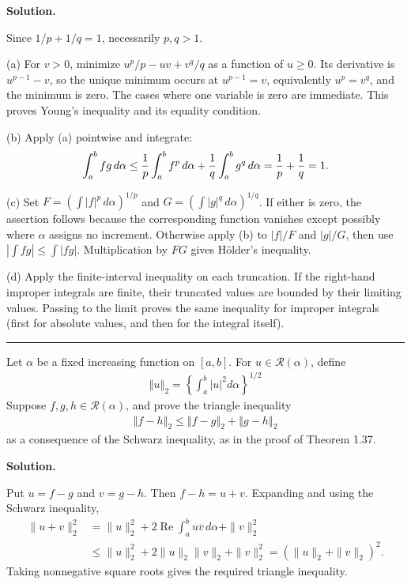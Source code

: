 \documentclass[12pt]{article}
\theoremstyle{definition}
\begin{document}
\smallskip
\noindent\textbf{Solution.}\quad


Since $1/p+1/q=1$, necessarily $p,q>1$.

(a) For $v>0$, minimize $u^p/p-uv+v^q/q$ as a function of $u\ge0$.  Its derivative is $u^{p-1}-v$, so the unique minimum occurs at $u^{p-1}=v$, equivalently $u^p=v^q$, and the minimum is zero.  The cases where one variable is zero are immediate.  This proves Young's inequality and its equality condition.

(b) Apply (a) pointwise and integrate:
\[
 \int_a^bfg\,d\alpha\le {1\over p}\int_a^bf^p\,d\alpha
       +{1\over q}\int_a^bg^q\,d\alpha={1\over p}+{1\over q}=1.
\]

(c) Set $F=(\int|f|^p\,d\alpha)^{1/p}$ and $G=(\int|g|^q\,d\alpha)^{1/q}$.  If either is zero, the assertion follows because the corresponding function vanishes except possibly where $\alpha$ assigns no increment.  Otherwise apply (b) to $|f|/F$ and $|g|/G$, then use $|\int fg|\le\int|fg|$.  Multiplication by $FG$ gives Hölder's inequality.

(d) Apply the finite-interval inequality on each truncation.  If the right-hand improper integrals are finite, their truncated values are bounded by their limiting values.  Passing to the limit proves the same inequality for improper integrals (first for absolute values, and then for the integral itself).




\bigskip\noindent\hrule\bigskip

Let $\alpha$ be a fixed increasing function on $[a,b]$. For $u\in\mathcal{R}(\alpha)$, define
\begin{align*}
\left\Vert u\right\Vert_2
=\left\{\int_a^b\left\vert u\right\vert^2d\alpha\right\}^{1/2}
\end{align*}
Suppose $f,g,h\in\mathcal{R}(\alpha)$, and prove the triangle inequality
\begin{align*}
\left\Vert f-h\right\Vert_2
\le\left\Vert f-g\right\Vert_2+\left\Vert g-h\right\Vert_2
\end{align*}
as a consequence of the Schwarz inequality, as in the proof of Theorem 1.37.

\smallskip
\noindent\textbf{Solution.}\quad


Put $u=f-g$ and $v=g-h$.  Then $f-h=u+v$.  Expanding and using the Schwarz inequality,
\begin{align*}
 \|u+v\|_2^2
 &=\|u\|_2^2+2\operatorname{Re}\int_a^bu\overline v\,d\alpha+\|v\|_2^2\\
 &\le\|u\|_2^2+2\|u\|_2\|v\|_2+\|v\|_2^2
  =(\|u\|_2+\|v\|_2)^2.
\end{align*}
Taking nonnegative square roots gives the required triangle inequality.
\end{document}
